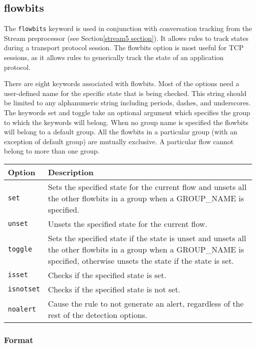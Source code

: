 \documentclass[english]{report}
\begin{document}
\subsection{flowbits}
\label{flowbits}

The \texttt{flowbits} keyword is used in conjunction with conversation tracking
from the Stream preprocessor (see Section\ref{stream5 section}).  It allows
rules to track states during a transport protocol session.  The flowbits option
is most useful for TCP sessions, as it allows rules to generically track the
state of an application protocol.

There are eight keywords associated with flowbits. Most of the options need a
user-defined name for the specific state that is being checked.  This string
should be limited to any alphanumeric string including periods, dashes, and
underscores. The keywords set and toggle take an optional argument which specifies
the group to which the keywords will belong. When no group name is specified the 
flowbits will belong to a default group. All the flowbits in a particular group 
(with an exception of default group) are mutually exclusive. A particular flow 
cannot belong to more than one group.

\begin{tabular}{| l | p{4.5in} |}
\hline
{\bf Option} & {\bf Description}\\
\hline
\hline
\texttt{set} & Sets the specified state for the current flow and unsets all the other 
flowbits in a group when a GROUP\_NAME is specified.\\
\hline
\texttt{unset} & Unsets the specified state for the current flow.\\
\hline
\texttt{toggle} & Sets the specified state if the state is unset and unsets all the 
other flowbits in a group when a GROUP\_NAME is specified, otherwise unsets the state 
if the state is set.\\
\hline
\texttt{isset} & Checks if the specified state is set.\\
\hline
\texttt{isnotset} & Checks if the specified state is not set.\\
\hline
\texttt{noalert} & Cause the rule to not generate an alert, regardless of the rest of the detection options.\\
\hline
\end{tabular}

\subsubsection{Format}
\end{document}
